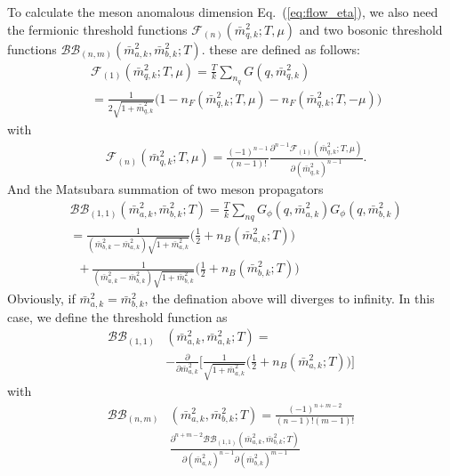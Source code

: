 \documentclass[%
reprint,
superscriptaddress,
showpacs,preprintnumbers,
 amsmath,amssymb,
 aps,
prd,
]{revtex4-1}
\def\Eq#1{Eq.~(\ref{#1})}
\begin{document}
To calculate the meson anomalous dimension \Eq{eq:flow_eta}, we also need the fermionic threshold functions $\mathcal{F}_{(n)}(\bar{m}_{q,k}^2;T,\mu)$ and  two bosonic threshold functions $\mathcal{BB}_{(n,m)}(\bar m_{a,k}^2,\bar m_{b,k}^2;T)$. these are defined as follows:
\begin{align}
	&\mathcal{F}_{(1)}(\bar{m}_{q,k}^2;T,\mu)=\frac{T}{k}\sum_{n_q} G( q, \bar{m}_{q,k}^2) \nonumber\\[2ex] 
	&=\frac{1}{2 \sqrt{1+\bar{m}_{q,k}^2}}\Big(1-n_F(\bar{m}_{q,k}^2;T,\mu)-n_F(\bar{m}_{q,k}^2;T,-\mu)\Big)\label{eq:thr_F1}
\end{align}
with
\begin{align}
	&\mathcal{F}_{(n)}(\bar{m}_{q,k}^2;T,\mu)=\frac{(-1)^{n-1}}{(n-1)!}\frac{\partial^{n-1}\mathcal{F}_{(1)}(\bar{m}_{q,k}^2;T,\mu)}{\partial(\bar{m}_{q,k}^2)^{n-1}}\label{eq:thr_Fn}.
\end{align}
And the Matsubara summation of two meson propagators
\begin{align}
	&\mathcal{BB}_{(1,1)}(\bar m_{a,k}^2,\bar m_{b,k}^2;T)=\frac{T}{k}\sum_{nq} G_\phi(q,\bar m_{a,k}^2) G_\phi(q,\bar m_{b,k}^2)\nonumber\\[2ex]
	&=\frac{1}{(\bar m_{b,k}^2-\bar m_{a,k}^2)\sqrt{1+\bar m_{a,k}^2}}\Big(\frac{1}{2}+n_B(\bar m_{a,k}^2;T)\Big)\nonumber\\[2ex]
	&\;\;+\frac{1}{(\bar m_{a,k}^2-\bar m_{b,k}^2)\sqrt{1+\bar m_{b,k}^2}}\Big(\frac{1}{2}+n_B(\bar m_{b,k}^2;T)\Big)\label{eq:thr_B1B1a}
\end{align}
Obviously, if $\bar m_{a,k}^2=\bar m_{b,k}^2$, the defination above will diverges to infinity. In this case, we  define the threshold function as
\begin{align}
	\mathcal{BB}_{(1,1)}&(\bar m_{a,k}^2,\bar m_{a,k}^2;T)=\nonumber\\[2ex]
	&-\frac{\partial}{\partial \bar m_{a,k}^2}\Big[\frac{1}{\sqrt{1+\bar m_{a,k}^2}}\Big(\frac{1}{2}+n_B(\bar m_{a,k}^2;T)\Big)\Big]\label{eq:thr_B1B1b}
\end{align}
with
\begin{align}
	\mathcal{BB}_{(n,m)}&(\bar m_{a,k}^2,\bar m_{b,k}^2;T)=\frac{(-1)^{n+m-2}}{(n-1)!(m-1)!}\nonumber\\[2ex]
	&\frac{\partial^{n+m-2} \mathcal{BB}_{(1,1)}(\bar m_{a,k}^2,\bar m_{b,k}^2;T)}{\partial(\bar m_{a,k}^2)^{n-1} \partial(\bar m_{b,k}^2)^{m-1}}\label{eq:thr_BnBm}
\end{align}
\end{document}
